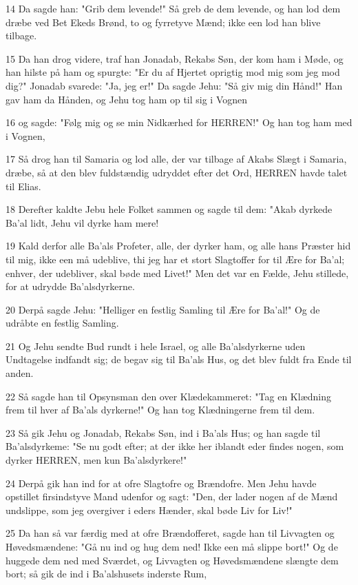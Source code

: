 \par 14 Da sagde han: "Grib dem levende!" Så greb de dem levende, og han lod dem dræbe ved Bet Ekeds Brønd, to og fyrretyve Mænd; ikke een lod han blive tilbage.
\par 15 Da han drog videre, traf han Jonadab, Rekabs Søn, der kom ham i Møde, og han hilste på ham og spurgte: "Er du af Hjertet oprigtig mod mig som jeg mod dig?" Jonadab svarede: "Ja, jeg er!" Da sagde Jehu: "Så giv mig din Hånd!" Han gav ham da Hånden, og Jehu tog ham op til sig i Vognen
\par 16 og sagde: "Følg mig og se min Nidkærhed for HERREN!" Og han tog ham med i Vognen,
\par 17 Så drog han til Samaria og lod alle, der var tilbage af Akabs Slægt i Samaria, dræbe, så at den blev fuldstændig udryddet efter det Ord, HERREN havde talet til Elias.
\par 18 Derefter kaldte Jebu hele Folket sammen og sagde til dem: "Akab dyrkede Ba'al lidt, Jehu vil dyrke ham mere!
\par 19 Kald derfor alle Ba'als Profeter, alle, der dyrker ham, og alle hans Præster hid til mig, ikke een må udeblive, thi jeg har et stort Slagtoffer for til Ære for Ba'al; enhver, der udebliver, skal bøde med Livet!" Men det var en Fælde, Jehu stillede, for at udrydde Ba'alsdyrkerne.
\par 20 Derpå sagde Jehu: "Helliger en festlig Samling til Ære for Ba'al!" Og de udråbte en festlig Samling.
\par 21 Og Jehu sendte Bud rundt i hele Israel, og alle Ba'alsdyrkerne uden Undtagelse indfandt sig; de begav sig til Ba'als Hus, og det blev fuldt fra Ende til anden.
\par 22 Så sagde han til Opsynsman den over Klædekammeret: "Tag en Klædning frem til hver af Ba'als dyrkerne!" Og han tog Klædningerne frem til dem.
\par 23 Så gik Jehu og Jonadab, Rekabs Søn, ind i Ba'als Hus; og han sagde til Ba'alsdyrkeme: "Se nu godt efter; at der ikke her iblandt eder findes nogen, som dyrker HERREN, men kun Ba'alsdyrkere!"
\par 24 Derpå gik han ind for at ofre Slagtofre og Brændofre. Men Jehu havde opstillet firsindstyve Mand udenfor og sagt: "Den, der lader nogen af de Mænd undslippe, som jeg overgiver i eders Hænder, skal bøde Liv for Liv!"
\par 25 Da han så var færdig med at ofre Brændofferet, sagde han til Livvagten og Høvedsmændene: "Gå nu ind og hug dem ned! Ikke een må slippe bort!" Og de huggede dem ned med Sværdet, og Livvagten og Høvedsmændene slængte dem bort; så gik de ind i Ba'alshusets inderste Rum,
